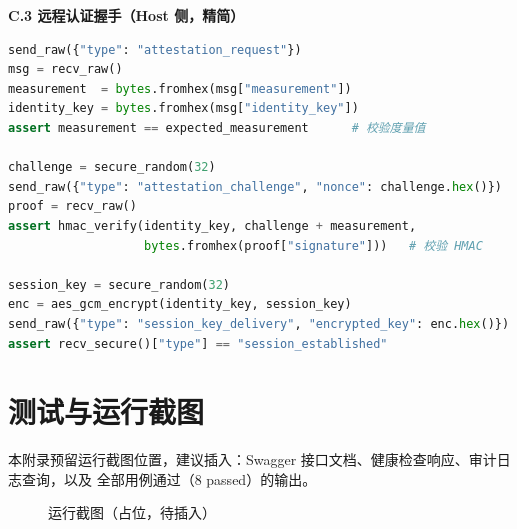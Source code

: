 \textbf{C.3 远程认证握手（Host 侧，精简）}
\begin{lstlisting}[language=Python]
send_raw({"type": "attestation_request"})
msg = recv_raw()
measurement  = bytes.fromhex(msg["measurement"])
identity_key = bytes.fromhex(msg["identity_key"])
assert measurement == expected_measurement      # 校验度量值

challenge = secure_random(32)
send_raw({"type": "attestation_challenge", "nonce": challenge.hex()})
proof = recv_raw()
assert hmac_verify(identity_key, challenge + measurement,
                   bytes.fromhex(proof["signature"]))   # 校验 HMAC

session_key = secure_random(32)
enc = aes_gcm_encrypt(identity_key, session_key)
send_raw({"type": "session_key_delivery", "encrypted_key": enc.hex()})
assert recv_secure()["type"] == "session_established"
\end{lstlisting}

\chapter{测试与运行截图}
\label{app:screens}

本附录预留运行截图位置，建议插入：Swagger 接口文档、健康检查响应、审计日志查询，以及  全部用例通过（8 passed）的输出。

\begin{figure}[H]
\centering
{}
\caption{运行截图（占位，待插入）}
\label{fig:screens}
\end{figure}
